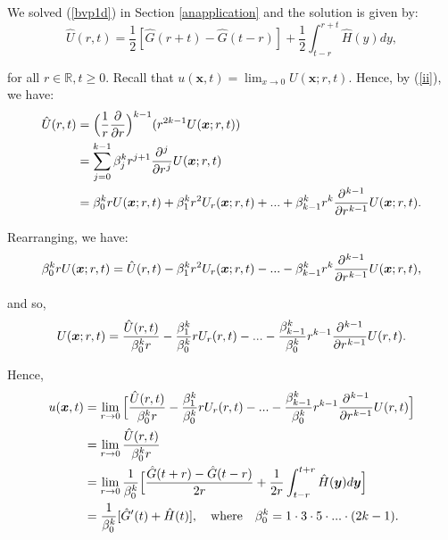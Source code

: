 \documentclass[a4paper, 12pt]{article}
\numberwithin{equation}{section}
\begin{document}
We solved (\ref{bvp1d}) in Section \ref{anapplication} and the solution is given
by: 
\begin{equation}\label{nomorelabels}
    \hat{U}(r,t)=\frac{1}{2}[\hat{G}(r+t)-\hat{G}(t-r)]+\frac{1}{2}\int_{t-r}^{r+t}\hat{H}(y)dy,
\end{equation}

for all $r\in\mathbb{R}, t \ge 0$. Recall that $u(\boldsymbol{x},t)=\lim_{x
\rightarrow 0} U(\boldsymbol{x}; r, t)$. Hence, by (\ref{ii}), we have:
\begin{equation*}
    \begin{aligned}
        \hat{U}(r,t)&=\Big(\frac{1}{r} \diffp[1]{}{r}\Big)^{k-1}(r^{2k-1}U(\boldsymbol{x};r,t))\\
        &=\sum_{j=0}^{k-1}\beta_j^k r^{j+1} \diffp[j]{}{r}U(\boldsymbol{x};r,t)\\ 
        &=\beta_0^k rU(\boldsymbol{x};r,t)+\beta_1^k r^2U_r(\boldsymbol{x};r,t)+...+\beta_{k-1}^k r^k\diffp[k-1]{}{r}U(\boldsymbol{x};r,t).
    \end{aligned}
\end{equation*}

Rearranging, we have:
\begin{equation*}
    \beta_0^k rU(\boldsymbol{x};r,t) = \hat{U}(r,t) - \beta_1^k r^2U_r(\boldsymbol{x};r,t) - ... -\beta_{k-1}^k r^k\diffp[k-1]{}{r}U(\boldsymbol{x};r,t),
\end{equation*}

and so,
\begin{equation*}
    U(\boldsymbol{x};r,t) = \frac{\hat{U}(r,t)}{\beta_0^k r} - \frac{\beta_1^k}{\beta_0^k} rU_r(r,t) - ... - \frac{\beta_{k-1}^k}{\beta_0^k} r^{k-1} \diffp[k-1]{}{r}U(r,t).
\end{equation*}

Hence,
\begin{equation*}
    \begin{aligned}
        u(\boldsymbol{x}, t)&=\lim_{r \rightarrow 0}\Big[\frac{\hat{U}(r,t)}{\beta_0^k r} - \frac{\beta_1^k}{\beta_0^k} rU_r(r,t) - ... - \frac{\beta_{k-1}^k}{\beta_0^k} r^{k-1} \diffp[k-1]{}{r}U(r,t)\Big]\\ 
        &=\lim_{r \rightarrow 0}\frac{\hat{U}(r,t)}{\beta_0^k r}\\ 
        &=\lim_{r \rightarrow 0} \frac{1}{\beta_0^k} \Big[\frac{\hat{G}(t+r)-\hat{G}(t-r)}{2r} + \frac{1}{2r}\int_{t-r}^{t+r} \hat{H}(\boldsymbol{y})d\boldsymbol{y}\Big]\\
        &= \frac{1}{\beta_0^k}[\hat{G}'(t)+\hat{H}(t)], \quad \textrm{where} \quad \beta_0^k = 1 \cdot 3 \cdot 5 \cdot ... \cdot (2k-1).
    \end{aligned}
\end{equation*}
\end{document}
